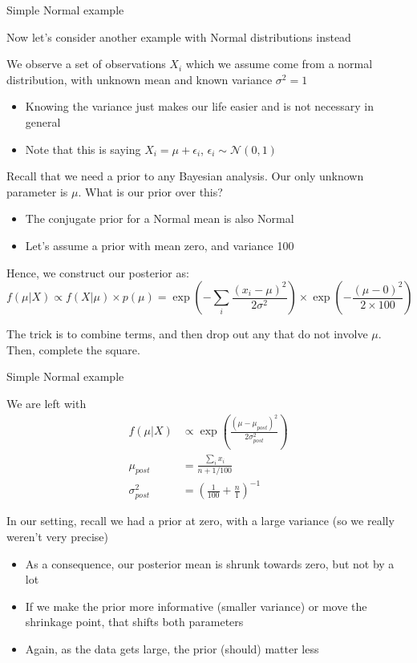 \documentclass[notes,11pt, aspectratio=169]{beamer}
\newenvironment{wideitemize}{\itemize\addtolength{\itemsep}{10pt}}{\enditemize}
\begin{document}
\begin{frame}{Simple Normal example}
  \begin{wideitemize}
  \item Now let's consider another example with Normal distributions instead
  \item We observe a set of observations $X_{i}$ which we assume come
    from a normal distribution, with unknown mean and known variance
    $\sigma^{2} = 1$
    \begin{itemize}
    \item Knowing the variance just makes our life easier and is not necessary in general
    \item Note that this is saying $X_{i} = \mu + \epsilon_{i}$, $\epsilon_{i} \sim \mathcal{N}(0, 1)$
    \end{itemize}
  \item Recall that we need a prior to any Bayesian analysis. Our only
    unknown parameter is $\mu$. What is our prior over this?
    \begin{itemize}
    \item The conjugate prior for a Normal mean is also Normal
    \item Let's assume a prior with mean zero, and variance 100
    \end{itemize}
  \item Hence, we construct our posterior as:
    $$ f(\mu | X) \propto f(X | \mu) \times p(\mu) =  \exp\left(-\sum_{i}\frac{(x_{i} - \mu)^{2}}{2 \sigma^{2}}\right) \times \exp\left(-\frac{(\mu - 0)^{2}}{2 \times 100}\right) $$
  \item The trick is to combine terms, and then drop out any that do
    not involve $\mu$. Then, complete the square.
  \end{wideitemize}
\end{frame}
\begin{frame}{Simple Normal example}
  \begin{wideitemize}
  \item We are left with
    \begin{align*}
      f(\mu | X) &\propto  \exp\left(\frac{(\mu - \mu_{post})^{2}}{2 \sigma_{post}^{2}}\right)\\
      \mu_{post}       &=  \frac{\sum_{i}x_{i}}{n + 1/100}\\
      \sigma^{2}_{post}       &=  \left(\frac{1}{100} + \frac{n}{1}\right)^{-1}
    \end{align*}
  \item In our setting, recall we had a prior at zero, with a large
    variance (so we really weren't very precise)
    \begin{itemize}
    \item As a consequence, our posterior mean is shrunk towards zero,
      but not by a lot
    \item If we make the prior more informative (smaller variance) or
      move the shrinkage point, that shifts both parameters
    \item Again, as the data gets large, the prior (should) matter less
    \end{itemize}
  \end{wideitemize}
  \end{frame}
\end{document}

